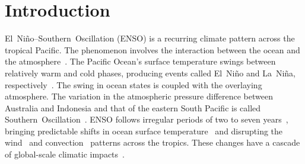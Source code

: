 \documentclass[atmosphere,article,accept,pdftex,moreauthors]{Definitions/mdpi}
\begin{document}
\section{Introduction}\label{sec:introduction}

El~Niño--Southern~Oscillation (ENSO) is a recurring climate pattern across the tropical Pacific. The phenomenon involves the interaction between the ocean and the atmosphere~\cite{bjerknes1969MWR}. The Pacific Ocean's surface temperature swings between relatively warm and cold phases, producing events called El~Niño and La~Niña, respectively~\cite{philander1989}. The swing in ocean states is coupled with the overlaying atmosphere. The variation in the atmospheric pressure difference between Australia and Indonesia and that of the eastern South Pacific is called Southern~Oscillation~\cite{walker1928MWR, julian1978MWR}. ENSO follows irregular periods of two to seven years~\cite{latif1998JGRO,rasmusson1982MWR}, bringing predictable shifts in ocean surface temperature~\cite{lin2019SR} and disrupting the \mbox{wind~\cite{rasmusson1982MWR, hu2023CD, maruyama1988JMSJ, kane2004IJC,wallace1998JGRO}} and convection~\cite{yang2013JAS} patterns across the tropics. These changes have a cascade of global-scale climatic impacts~\cite{trenberth1998JGRO, annamalai2023JC, yeh2018RG}.
\end{document}
